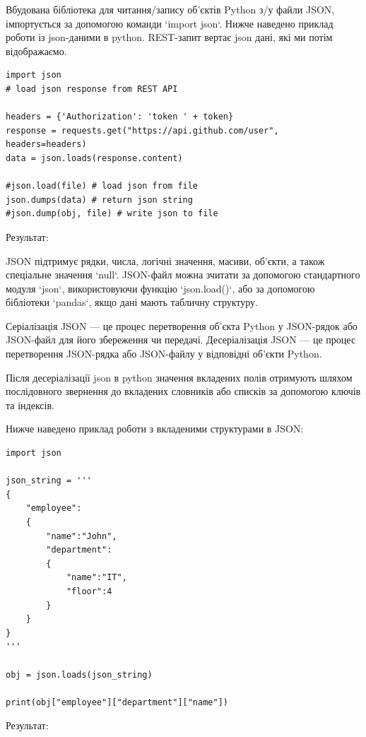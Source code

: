 Вбудована бібліотека для читання/запису об'єктів Python з/у файли JSON, імпортується за допомогою 
команди `import json`. Нижче наведено приклад роботи із json-даними в python. REST-запит вертає 
json дані, які ми потім відображаємо.

\begin{lstlisting}
import json
# load json response from REST API

headers = {'Authorization': 'token ' + token}
response = requests.get("https://api.github.com/user", headers=headers)
data = json.loads(response.content)

#json.load(file) # load json from file
json.dumps(data) # return json string
#json.dump(obj, file) # write json to file
\end{lstlisting}

Результат:

\begin{console}
'{"login": "maxvonlancaster", "id": 38358502, "node_id": "MDQ6VXNlcjM4MzU4NTAy", "avatar_url": ...
\end{console}

JSON підтримує рядки, числа, логічні значення, масиви, об'єкти, а також спеціальне значення 
`null`. JSON-файл можна зчитати за допомогою стандартного модуля `json`, використовуючи 
функцію `json.load()`, або за допомогою бібліотеки `pandas`, якщо дані мають табличну 
структуру. 

Серіалізація JSON — це процес перетворення об'єкта Python у JSON-рядок або JSON-файл для 
його збереження чи передачі. Десеріалізація JSON — це процес перетворення JSON-рядка або 
JSON-файлу у відповідні об'єкти Python.

Після десеріалізації json в python значення вкладених полів отримують шляхом послідовного 
звернення до вкладених словників або списків за допомогою ключів та індексів.

Нижче наведено приклад роботи з вкладеними структурами в JSON:


\begin{lstlisting}
import json

json_string = '''
{
    "employee":
    {
        "name":"John",
        "department":
        {
            "name":"IT",
            "floor":4
        }
    }
}
'''

obj = json.loads(json_string)

print(obj["employee"]["department"]["name"])
\end{lstlisting}

Результат:

